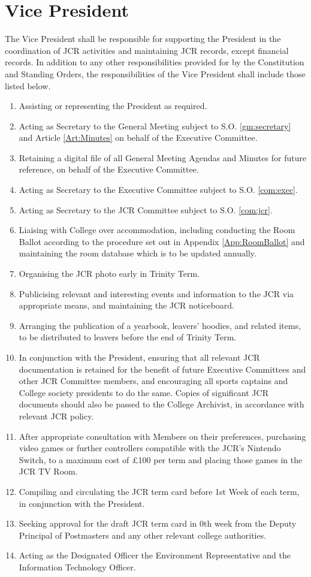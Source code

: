 \section{Vice President}
\npara The Vice President shall be responsible for supporting the President in the coordination of JCR activities and maintaining JCR records, except financial records.
\npara In addition to any other responsibilities provided for by the Constitution and Standing Orders, the responsibilities of the Vice President shall include those listed below.
\begin{enumerate}
    \item Assisting or representing the President as required.
    \item Acting as Secretary to the General Meeting subject to S.O. \ref{gm:secretary} and Article \ref{Art:Minutes} on behalf of the Executive Committee.
    \item Retaining a digital file of all General Meeting Agendas and Minutes for future reference, on behalf of the Executive Committee.
    \item Acting as Secretary to the Executive Committee subject to S.O. \ref{com:exec}.
    \item Acting as Secretary to the JCR Committee subject to S.O. \ref{com:jcr}.
    \item Liaising with College over accommodation, including conducting the Room Ballot according to the procedure set out in Appendix \ref{App:RoomBallot} and maintaining the room database which is to be updated annually.
    \item Organising the JCR photo early in Trinity Term.
    \item Publicising relevant and interesting events and information to the JCR via appropriate means, and maintaining the JCR noticeboard.
    \item Arranging the publication of a yearbook, leavers' hoodies, and related items, to be distributed to leavers before the end of Trinity Term.
    \item In conjunction with the President, ensuring that all relevant JCR documentation is retained for the benefit of future Executive Committees and other JCR Committee members, and encouraging all sports captains and College society presidents to do the same. Copies of significant JCR documents should also be passed to the College Archivist, in accordance with relevant JCR policy. 
    \item After appropriate consultation with Members on their preferences, purchasing video games or further controllers compatible with the JCR’s Nintendo Switch, to a maximum cost of £100 per term and placing those games in the JCR TV Room.
    \item Compiling and circulating the JCR term card before 1st Week of each term, in conjunction with the President. 
    \item Seeking approval for the draft JCR term card in 0th week from the Deputy Principal of Postmasters and any other relevant college authorities. 
    \item Acting as the Designated Officer the Environment Representative and the Information Technology Officer.
\end{enumerate}


